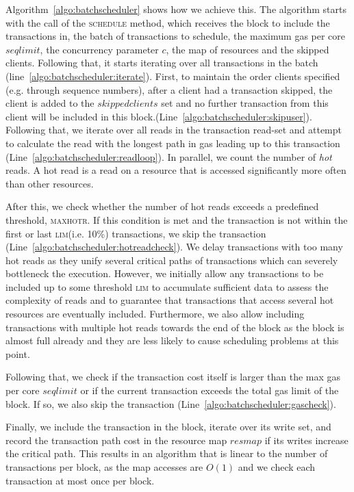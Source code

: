 Algorithm~\ref{algo:batchscheduler} shows how we achieve this. The algorithm starts with the call of the \textsc{schedule} method, which receives the block to include the transactions in, the batch of transactions to schedule, the maximum gas per core $seqlimit$, the concurrency parameter $c$, the map of resources and the skipped clients. Following that, it starts iterating over all transactions in the batch (line~\ref{algo:batchscheduler:iterate}).
First, to maintain the order clients specified (e.g. through sequence numbers), after a client had a transaction skipped, the client is added to the $skippedclients$ set and no further transaction from this client will be included in this block.(Line~\ref{algo:batchscheduler:skipuser}).
Following that, we iterate over all reads in the transaction read-set and attempt to calculate the read with the longest path in gas leading up to this transaction (Line~\ref{algo:batchscheduler:readloop}).
In parallel, we count the number of \textit{hot} reads. A hot read is a read on a resource that is accessed significantly more often than other resources. 

After this, we check whether the number of hot reads exceeds a predefined threshold, \textsc{maxhotr}. If this condition is met and the transaction is not within the first or last \textsc{lim}(i.e. 10\%) transactions, we skip the transaction (Line~\ref{algo:batchscheduler:hotreadcheck}).
We delay transactions with too many hot reads as they unify several critical paths of transactions which can severely bottleneck the execution.
However, we initially allow any transactions to be included up to some threshold \textsc{lim} to accumulate sufficient data to assess the complexity of reads and to guarantee that transactions that access several hot resources are eventually included. Furthermore, we also allow including transactions with multiple hot reads towards the end of the block as the block is almost full already and they are less likely to cause scheduling problems at this point.

Following that, we check if the transaction cost itself is larger than the max gas per core $seqlimit$ or if the current transaction exceeds the total gas limit of the block. If so, we also skip the transaction (Line~\ref{algo:batchscheduler:gascheck}).

Finally, we include the transaction in the block, iterate over its write set, and record the transaction path cost in the resource map $resmap$ if its writes increase the critical path.
This results in an algorithm that is linear to the number of transactions per block, as the map accesses are $O(1)$ and we check each transaction at most once per block.


